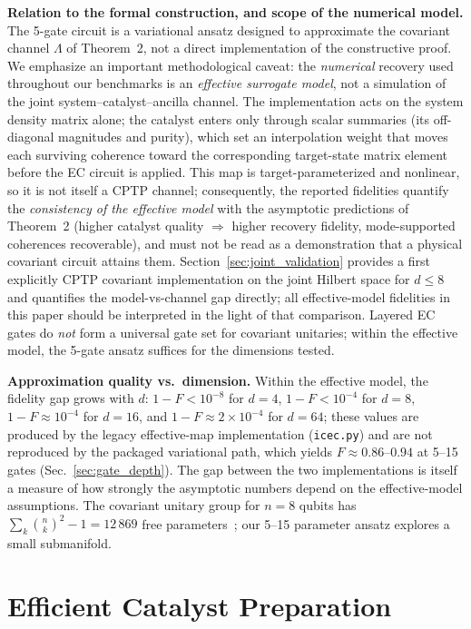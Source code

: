 \documentclass[pra,twocolumn,superscriptaddress,longbibliography,floatfix]{revtex4-2}
\begin{document}
\textbf{Relation to the formal construction, and scope of the numerical model.}
The 5-gate circuit is a variational ansatz designed to approximate the covariant channel $\Lambda$ of Theorem~2, not a direct implementation of the constructive proof.
We emphasize an important methodological caveat: the \emph{numerical} recovery used throughout our benchmarks is an \emph{effective surrogate model}, not a simulation of the joint system--catalyst--ancilla channel.
The implementation acts on the system density matrix alone; the catalyst enters only through scalar summaries (its off-diagonal magnitudes and purity), which set an interpolation weight that moves each surviving coherence toward the corresponding target-state matrix element before the EC circuit is applied.
This map is target-parameterized and nonlinear, so it is not itself a CPTP channel; consequently, the reported fidelities quantify the \emph{consistency of the effective model} with the asymptotic predictions of Theorem~2 (higher catalyst quality $\Rightarrow$ higher recovery fidelity, mode-supported coherences recoverable), and must not be read as a demonstration that a physical covariant circuit attains them.
Section~\ref{sec:joint_validation} provides a first explicitly CPTP covariant implementation on the joint Hilbert space for $d \leq 8$ and quantifies the model-vs-channel gap directly; all effective-model fidelities in this paper should be interpreted in the light of that comparison.
Layered EC gates do \emph{not} form a universal gate set for covariant unitaries; within the effective model, the 5-gate ansatz suffices for the dimensions tested.

\textbf{Approximation quality vs.\ dimension.}
Within the effective model, the fidelity gap grows with $d$: $1 - F < 10^{-8}$ for $d = 4$, $1 - F < 10^{-4}$ for $d = 8$, $1 - F \approx 10^{-4}$ for $d = 16$, and $1 - F \approx 2 \times 10^{-4}$ for $d = 64$; these values are produced by the legacy effective-map implementation (\texttt{icec.py}) and are not reproduced by the packaged variational path, which yields $F \approx 0.86$--$0.94$ at 5--15 gates (Sec.~\ref{sec:gate_depth}).
The gap between the two implementations is itself a measure of how strongly the asymptotic numbers depend on the effective-model assumptions.
The covariant unitary group for $n = 8$ qubits has $\sum_k \binom{n}{k}^2 - 1 = 12\,869$ free parameters~\cite{Schuch2004}; our 5--15 parameter ansatz explores a small submanifold.


\section{Efficient Catalyst Preparation}
\label{sec:catalyst_prep}
\end{document}
